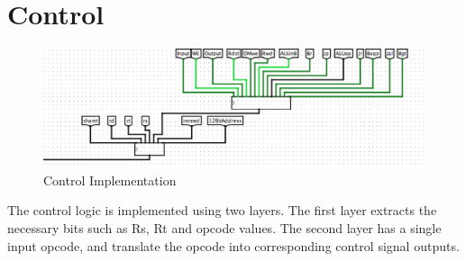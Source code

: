 \documentclass{article}
\begin{document}
	\section{Control}
	\begin{figure}[H]
		\begin{center}
			\includegraphics[scale=0.5]{control}
			\caption{Control Implementation}
		\end{center}
	\end{figure}
	The control logic is implemented using two layers. The first layer extracts the necessary bits such as Rs, Rt and opcode values. The second layer has a single input opcode, and translate the opcode into corresponding control signal outputs. 
\end{document}
